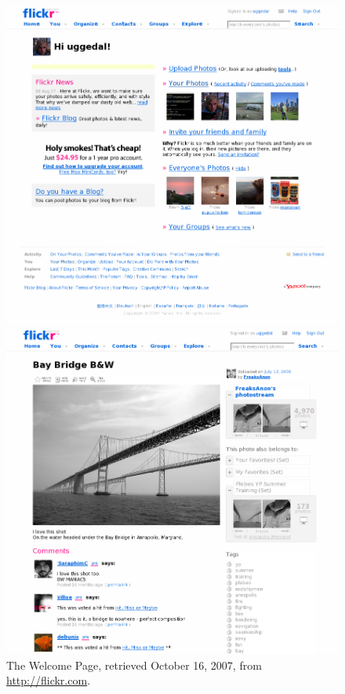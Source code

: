\begin{figure}
  \captionstyle{\raggedright}
  \begin{whole}
    \begin{minipage}[t]{0.475\wholewidth}
      \includegraphics[width=\textwidth]{scrsh_flickr_welcome}
      \caption[Flickr Welcome Page]{%
         The Welcome Page,
         retrieved October 16, 2007, from \url{http://flickr.com}.}
      \label{figure:scrsh.flickr.welcome}
    \end{minipage}
    \hfill
    \begin{minipage}[t]{0.475\wholewidth}
      \includegraphics[width=\textwidth]{scrsh_flickr_photo_detail}

\end{minipage}
\end{whole}
\end{figure}
